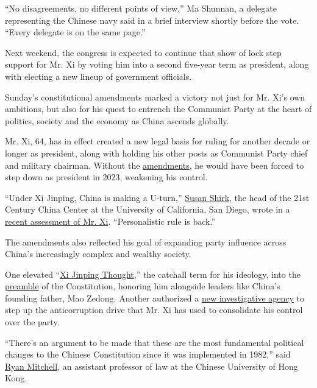 ``No disagreements, no different points of view,'' Ma Shunnan, a
delegate representing the Chinese navy said in a brief interview shortly
before the vote. ``Every delegate is on the same page.''

Next weekend, the congress is expected to continue that show of lock
step support for Mr. Xi by voting him into a second five-year term as
president, along with electing a new lineup of government officials.

Sunday's constitutional amendments marked a victory not just for Mr.
Xi's own ambitions, but also for his quest to entrench the Communist
Party at the heart of politics, society and the economy as China ascends
globally.

Mr. Xi, 64, has in effect created a new legal basis for ruling for
another decade or longer as president, along with holding his other
posts as Communist Party chief and military chairman. Without the
\href{http://www.npc.gov.cn/npc/dbdhhy/13_1/2018-03/06/content_2042508.htm}{amendments},
he would have been forced to step down as president in 2023, weakening
his control.

``Under Xi Jinping, China is making a U-turn,''
\href{https://gps.ucsd.edu/faculty-directory/susan-shirk.html}{Susan
Shirk}, the head of the 21st Century China Center at the University of
California, San Diego, wrote in a
\href{https://www.journalofdemocracy.org/sites/default/files/media/29.2\%E2\%80\%94Shirk\%E2\%80\%94AdvanceVersion.pdf}{recent
assessment of Mr. Xi}. ``Personalistic rule is back.''

The amendments also reflected his goal of expanding party influence
across China's increasingly complex and wealthy society.

One elevated
``\href{https://www.nytimes.com/2018/02/26/world/asia/xi-jinping-thought-explained-a-new-ideology-for-a-new-era.html}{Xi
Jinping Thought},'' the catchall term for his ideology, into the
\href{http://www.hkhrm.org.hk/english/law/const01.html}{preamble} of the
Constitution, honoring him alongside leaders like China's founding
father, Mao Zedong. Another authorized a
\href{https://www.nytimes.com/2017/11/29/world/asia/china-xi-jinping-anticorruption.html}{new
investigative agency} to step up the anticorruption drive that Mr. Xi
has used to consolidate his control over the party.

``There's an argument to be made that these are the most fundamental
political changes to the Chinese Constitution since it was implemented
in 1982,'' said
\href{https://www.law.cuhk.edu.hk/en/people/info.php?id=237}{Ryan
Mitchell}, an assistant professor of law at the Chinese University of
Hong Kong.

